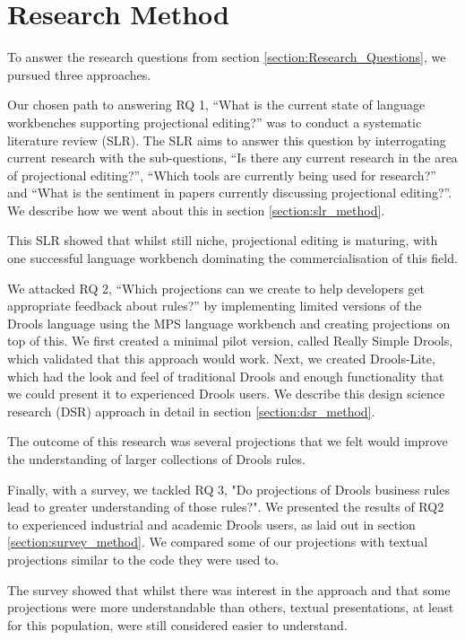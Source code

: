 \section{Research Method}
\label{section:Research_Method}

To answer the research questions from section \ref{section:Research_Questions}, we pursued three approaches.

Our chosen path to answering RQ 1, ``What is the current state of language workbenches supporting projectional editing?'' was to conduct a systematic literature review (SLR).
The SLR aims to answer this question by interrogating current research with the sub-questions, ``Is there any current research in the area of projectional editing?'',  ``Which tools are currently being used for research?'' and ``What is the sentiment in papers currently discussing projectional editing?''.
We describe how we went about this in section \ref{section:slr_method}. 

This SLR showed that whilst still niche, projectional editing is maturing, with one successful language workbench dominating the commercialisation of this field.

We attacked RQ 2, ``Which projections can we create to help developers get appropriate feedback about rules?'' by implementing limited versions of the Drools language using the MPS language workbench and creating projections on top of this.
We first created a minimal pilot version, called Really Simple Drools, which validated that this approach would work.
Next, we created Drools-Lite, which had the look and feel of traditional Drools and enough functionality that we could present it to experienced Drools users.
We describe this design science research (DSR) approach in detail in section \ref{section:dsr_method}.

The outcome of this research was several projections that we felt would improve the understanding of larger collections of Drools rules.

Finally, with a survey, we tackled RQ 3, "Do projections of Drools business rules lead to greater understanding of those rules?".
We presented the results of RQ2 to experienced industrial and academic Drools users, as laid out in section \ref{section:survey_method}.
We compared some of our projections with textual projections similar to the code they were used to.

The survey showed that whilst there was interest in the approach and that some projections were more understandable than others, textual presentations, at least for this population, were still considered easier to understand.